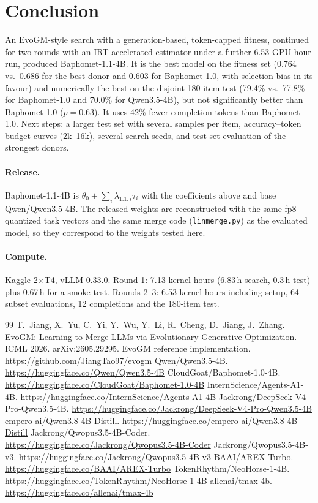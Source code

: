 \documentclass[10pt,a4paper]{article}
\begin{document}
\section{Conclusion}
An EvoGM-style search with a generation-based, token-capped fitness, continued for two rounds with an IRT-accelerated estimator under a further 6.53-GPU-hour run, produced Baphomet-1.1-4B. It is the best model on the fitness set (0.764 vs.\ 0.686 for the best donor and 0.603 for Baphomet-1.0, with selection bias in its favour) and numerically the best on the disjoint 180-item test (79.4\% vs.\ 77.8\% for Baphomet-1.0 and 70.0\% for Qwen3.5-4B), but not significantly better than Baphomet-1.0 ($p=0.63$). It uses 42\% fewer completion tokens than Baphomet-1.0. Next steps: a larger test set with several samples per item, accuracy--token budget curves (2k--16k), several search seeds, and test-set evaluation of the strongest donors.

\paragraph{Release.} Baphomet-1.1-4B is $\theta_0+\sum_i\lambda_{1.1,i}\tau_i$ with the coefficients above and base Qwen/Qwen3.5-4B. The released weights are reconstructed with the same fp8-quantized task vectors and the same merge code (\texttt{linmerge.py}) as the evaluated model, so they correspond to the weights tested here.

\paragraph{Compute.} Kaggle 2$\times$T4, vLLM 0.33.0. Round 1: 7.13 kernel hours (6.83\,h search, 0.3\,h test) plus 0.67\,h for a smoke test. Rounds 2--3: 6.53 kernel hours including setup, 64 subset evaluations, 12 completions and the 180-item test.

\small
\begin{thebibliography}{99}
 T.~Jiang, X.~Yu, C.~Yi, Y.~Wu, Y.~Li, R.~Cheng, D.~Jiang, J.~Zhang. EvoGM: Learning to Merge LLMs via Evolutionary Generative Optimization. ICML 2026. arXiv:2605.29295.
 EvoGM reference implementation. \url{https://github.com/JiangTao97/evogm}
 Qwen/Qwen3.5-4B. \url{https://huggingface.co/Qwen/Qwen3.5-4B}
 CloudGoat/Baphomet-1.0-4B. \url{https://huggingface.co/CloudGoat/Baphomet-1.0-4B}
 InternScience/Agents-A1-4B. \url{https://huggingface.co/InternScience/Agents-A1-4B}
 Jackrong/DeepSeek-V4-Pro-Qwen3.5-4B. \url{https://huggingface.co/Jackrong/DeepSeek-V4-Pro-Qwen3.5-4B}
 empero-ai/Qwen3.8-4B-Distill. \url{https://huggingface.co/empero-ai/Qwen3.8-4B-Distill}
 Jackrong/Qwopus3.5-4B-Coder. \url{https://huggingface.co/Jackrong/Qwopus3.5-4B-Coder}
 Jackrong/Qwopus3.5-4B-v3. \url{https://huggingface.co/Jackrong/Qwopus3.5-4B-v3}
 BAAI/AREX-Turbo. \url{https://huggingface.co/BAAI/AREX-Turbo}
 TokenRhythm/NeoHorse-1-4B. \url{https://huggingface.co/TokenRhythm/NeoHorse-1-4B}
 allenai/tmax-4b. \url{https://huggingface.co/allenai/tmax-4b}
\end{thebibliography}
\end{document}
